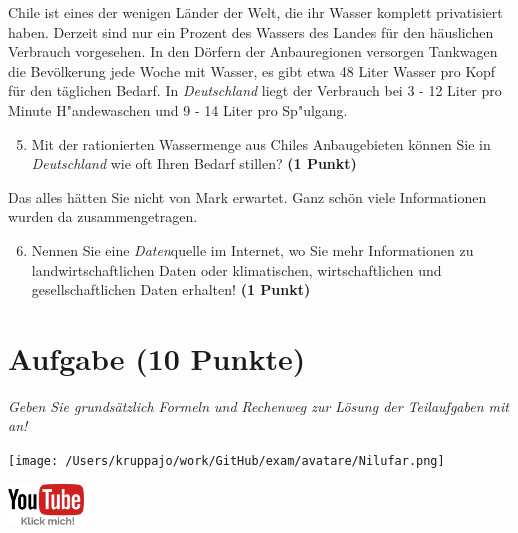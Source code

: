\documentclass[a4paper, 9pt]{scrartcl}\usepackage[]{graphicx}\usepackage[]{xcolor}
\begin{document}
Chile ist eines der wenigen Länder der Welt, die ihr Wasser komplett privatisiert haben. Derzeit sind nur ein Prozent des Wassers des Landes für den häuslichen Verbrauch vorgesehen. In den Dörfern der Anbauregionen versorgen Tankwagen die Bevölkerung jede Woche mit Wasser, es gibt etwa 48 Liter Wasser pro Kopf für den täglichen Bedarf. In \textit{Deutschland} liegt der Verbrauch bei 3 - 12 Liter pro Minute H{"a}ndewaschen und 9 - 14 Liter pro Sp{"u}lgang.

\begin{enumerate}
  \setcounter{enumi}{4}
\item Mit der rationierten Wassermenge aus Chiles Anbaugebieten können Sie in \textit{Deutschland} wie oft Ihren Bedarf stillen? \textbf{(1 Punkt)}
\end{enumerate}

Das alles hätten Sie nicht von Mark erwartet. Ganz schön viele Informationen wurden da zusammengetragen.

\begin{enumerate}
  \setcounter{enumi}{5}  
  \item Nennen Sie eine \textit{Daten}quelle im Internet, wo Sie mehr Informationen zu landwirtschaftlichen Daten oder klimatischen, wirtschaftlichen und gesellschaftlichen Daten erhalten! \textbf{(1 Punkt)}
\end{enumerate}



 
\clearpage

\section{Aufgabe \hfill (10 Punkte)}

\textit{Geben Sie grundsätzlich Formeln und Rechenweg zur Lösung der Teilaufgaben mit an!} \\[1Ex]
 

 
\ifcollection
\begin{flushright}
\tiny\vspace{-3Ex}
\textbf{\examinhaltstart}
\exammodulemathstat
\vspace{-4Ex}
\end{flushright}
\begin{minipage}[t]{0.5\textwidth}
\texttt{[image: /Users/kruppajo/work/GitHub/exam/avatare/Nilufar.png]}
\end{minipage}
\begin{minipage}[t]{0.5\textwidth}
\hfill
\href{https://youtu.be/WZSxntiNF8s}{\includegraphics[width = 2cm]{img/youtube}}
\end{minipage}
\fi
\end{document}
